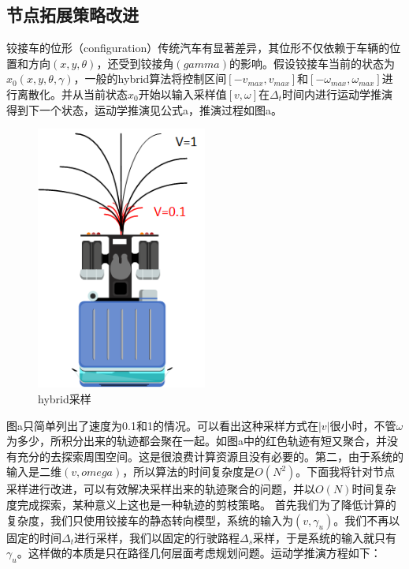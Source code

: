 \documentclass[master,academic]{ysuthesis} %
\begin{document}
		\subsection{节点拓展策略改进}
		铰接车的位形（configuration）传统汽车有显著差异，其位形不仅依赖于车辆的位置和方向$(x,y,\theta)$，还受到铰接角$(gamma)$的影响。假设铰接车当前的状态为$x_0(x,y,\theta,\gamma)$，一般的hybrid算法将控制区间$[-v_{max},v_{max}]$和$[-\omega_{max},\omega_{max}]$进行离散化。并从当前状态$x_0$开始以输入采样值$[v,\omega]$在$\Delta_t$时间内进行运动学推演得到下一个状态，运动学推演见公式a，推演过程如图a。
		\begin{figure}[!ht]
			\centering
			\includegraphics[width=0.5\textwidth]{hybrid采样.png}
			\caption{hybrid采样}
			\label{fig:hybrid采样}
		\end{figure}
		图a只简单列出了速度为0.1和1的情况。可以看出这种采样方式在$|v|$很小时，不管$\omega$为多少，所积分出来的轨迹都会聚在一起。如图a中的红色轨迹有短又聚合，并没有充分的去探索周围空间。这是很浪费计算资源且没有必要的。第二，由于系统的输入是二维$(v,omega)$，所以算法的时间复杂度是$O(N^2)$。下面我将针对节点采样进行改进，可以有效解决采样出来的轨迹聚合的问题，并以$O(N)$时间复杂度完成探索，某种意义上这也是一种轨迹的剪枝策略。 
		首先我们为了降低计算的复杂度，我们只使用铰接车的静态转向模型，系统的输入为$(v,\gamma_u)$。我们不再以固定的时间$\Delta_t$进行采样，我们以固定的行驶路程$\Delta_s$采样，于是系统的输入就只有$\gamma_u$。这样做的本质是只在路径几何层面考虑规划问题。运动学推演方程如下：
\end{document}
